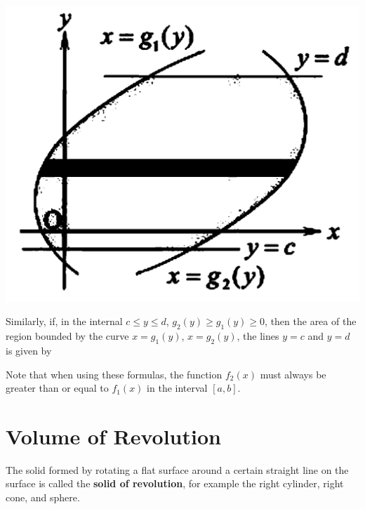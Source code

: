     \begin{center}
        \includegraphics[scale=0.15]{assets/28-17.png}
    \end{center}

    Similarly, if, in the internal $c \leq y \leq d$, $g_2(y) \geq g_1(y) \geq 0$,
    then the area of the region bounded by the curve $x = g_1(y)$, $x = g_2(y)$,
    the lines $y = c$ and $y = d$ is given by
    \begin{center}
    \end{center}
    Note that when using these formulas, the function $f_2(x)$ must always be greater than or equal to $f_1(x)$ in the interval $[a, b]$.

    \newpage
    

    

    \newpage
    \section{Volume of Revolution}
    The solid formed by rotating a flat surface around a certain straight line on
    the surface is called the \textbf{solid of revolution}, for example the right
    cylinder, right cone, and sphere.


